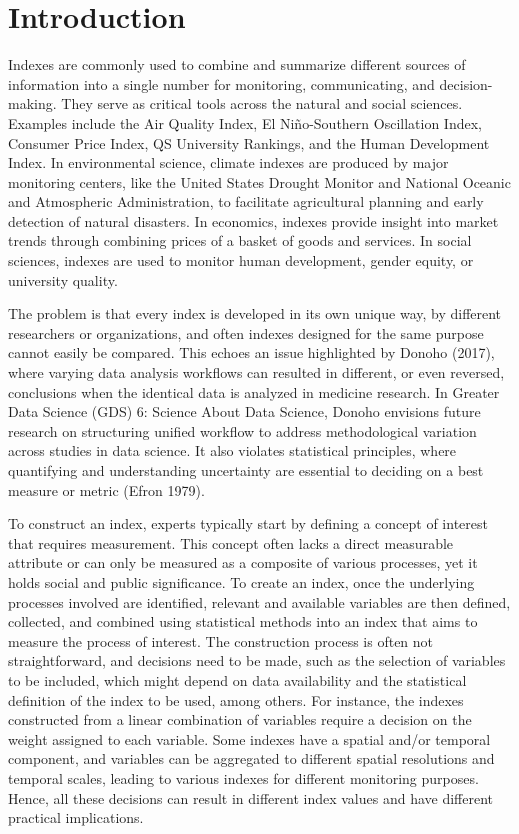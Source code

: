 \documentclass[
]{interact}
\begin{document}
\section{Introduction}\label{introduction}

Indexes are commonly used to combine and summarize different sources of
information into a single number for monitoring, communicating, and
decision-making. They serve as critical tools across the natural and
social sciences. Examples include the Air Quality Index, El
Niño-Southern Oscillation Index, Consumer Price Index, QS University
Rankings, and the Human Development Index. In environmental science,
climate indexes are produced by major monitoring centers, like the
United States Drought Monitor and National Oceanic and Atmospheric
Administration, to facilitate agricultural planning and early detection
of natural disasters. In economics, indexes provide insight into market
trends through combining prices of a basket of goods and services. In
social sciences, indexes are used to monitor human development, gender
equity, or university quality.

The problem is that every index is developed in its own unique way, by
different researchers or organizations, and often indexes designed for
the same purpose cannot easily be compared. This echoes an issue
highlighted by Donoho (2017), where varying data analysis workflows can
resulted in different, or even reversed, conclusions when the identical
data is analyzed in medicine research. In Greater Data Science (GDS) 6:
Science About Data Science, Donoho envisions future research on
structuring unified workflow to address methodological variation across
studies in data science. It also violates statistical principles, where
quantifying and understanding uncertainty are essential to deciding on a
best measure or metric (Efron 1979).

To construct an index, experts typically start by defining a concept of
interest that requires measurement. This concept often lacks a direct
measurable attribute or can only be measured as a composite of various
processes, yet it holds social and public significance. To create an
index, once the underlying processes involved are identified, relevant
and available variables are then defined, collected, and combined using
statistical methods into an index that aims to measure the process of
interest. The construction process is often not straightforward, and
decisions need to be made, such as the selection of variables to be
included, which might depend on data availability and the statistical
definition of the index to be used, among others. For instance, the
indexes constructed from a linear combination of variables require a
decision on the weight assigned to each variable. Some indexes have a
spatial and/or temporal component, and variables can be aggregated to
different spatial resolutions and temporal scales, leading to various
indexes for different monitoring purposes. Hence, all these decisions
can result in different index values and have different practical
implications.
\end{document}
